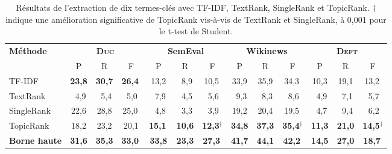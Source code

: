         \begin{table}
          \centering
          \begin{tabular}{l|c@{~~}c@{~~}c@{~}|c@{~~}c@{~~}c@{~}|c@{~~}c@{~~}c@{~}|c@{~~}c@{~~}c@{~}}
            \toprule
            \multirow{2}{*}[-2pt]{\textbf{Méthode}} & \multicolumn{3}{c|}{\textbf{\textsc{Duc}}} & \multicolumn{3}{c|}{\textbf{SemEval}} & \multicolumn{3}{c|}{\textbf{Wikinews}} & \multicolumn{3}{c}{\textbf{\textsc{Deft}}}\\
            \cline{2-4}\cline{5-7}\cline{8-10}\cline{11-13}
            & P & R & F & P & R & F & P & R & F & P & R & F\\
            \hline
            TF-IDF & \textbf{23,8} & \textbf{30,7} & \textbf{26,4}$^{~}$ & 13,2 & $~~$8,9 & 10,5$^{~}$ & 33,9 & 35,9 & 34,3$^{~}$ & 10,3 & 19,1 & 13,2$^{~}$\\
            TextRank & $~~$4,9 & $~~$5,4 & $~~$5,0$^{~}$ & $~~$7,9 & $~~$4,5 & $~~$5,6$^{~}$ & $~~$9,3 & $~~$8,3 & $~~$8,6$^{~}$ & $~~$4,9 & $~~$7,1 & $~~$5,7$^{~}$\\
            SingleRank & 22,6 & 28,8 & 25,0$^{~}$ & $~~$4,8 & $~~$3,3 & $~~$3,9$^{~}$ & 19,2 & 20,4 & 19,5$^{~}$ & $~~$4,7 & $~~$9,4 & $~~$6,2$^{~}$\\
            TopicRank & 18,2 & 23,2 & 20,1 & \textbf{15,1}$^{~}$ & \textbf{10,6} & \textbf{12,3}$^\dagger$ & \textbf{34,8} & \textbf{37,3} & \textbf{35,4}$^\dagger$ & \textbf{11,3} & \textbf{21,0} & \textbf{14,5}$^\dagger$\\
            \hline
            \textbf{Borne haute} & \textbf{31,6} & \textbf{35,3} & \textbf{33,0}$^{~}$ & \textbf{33,8} & \textbf{23,3} & \textbf{27,3}$^{~}$ & \textbf{41,7} & \textbf{44,1} & \textbf{42,2}$^{~}$ & \textbf{14,5} & \textbf{27,0} & \textbf{18,7}$^{~}$\\
            \bottomrule
          \end{tabular}
          \caption[Résultats de l'extraction de dix termes-clés avec TF-IDF,
                   TextRank, SingleRank et TopicRank]{
            Résultats de l'extraction de dix termes-clés avec TF-IDF, TextRank,
            SingleRank et TopicRank. $\dagger$ indique une amélioration
            significative de TopicRank vis-à-vis de TextRank et SingleRank, à
            0,001 pour le t-test de Student.
            \label{tab:resultats_globaux}
          }
        \end{table}

